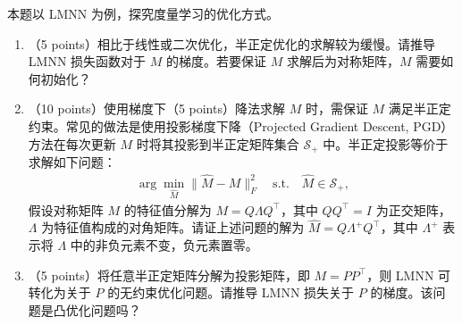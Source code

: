 \documentclass[answers]{exam}  %
\begin{document}
\begin{questions}
\begin{parts}
\vspace{\baselineskip}本题以 LMNN 为例，探究度量学习的优化方式。
\begin{enumerate}
    \item （5 points）相比于线性或二次优化，半正定优化的求解较为缓慢。请推导 LMNN 损失函数对于 $M$ 的梯度。若要保证 $M$ 求解后为对称矩阵，$M$ 需要如何初始化？
    \item （10 points）使用梯度下（5 points）降法求解 $M$ 时，需保证 $M$ 满足半正定约束。常见的做法是使用投影梯度下降（Projected Gradient Descent, PGD）方法在每次更新 $M$ 时将其投影到半正定矩阵集合 $\mathcal{S}_+$ 中。半正定投影等价于求解如下问题：
    \begin{align}
        \arg\min_{\hat{M}} \|\hat{M} - M\|_F^2 \quad \text{s.t.} \quad \hat{M} \in \mathcal{S}_+,
    \end{align}
    假设对称矩阵 $M$ 的特征值分解为 $M = Q \Lambda Q^\top$，其中 $Q Q^\top = I$ 为正交矩阵，$\Lambda$ 为特征值构成的对角矩阵。请证上述问题的解为 $\hat{M} = Q {\Lambda}^{+} Q^\top$，其中 ${\Lambda}^{+}$ 表示将 $\Lambda$ 中的非负元素不变，负元素置零。
    \item （5 points）将任意半正定矩阵分解为投影矩阵，即 $M = P P^\top$，则 LMNN 可转化为关于 $P$ 的无约束优化问题。请推导 LMNN 损失关于 $P$ 的梯度。该问题是凸优化问题吗？
\end{enumerate}
\end{parts}

\begin{solution}
\end{solution}
\end{questions}
\end{document}
